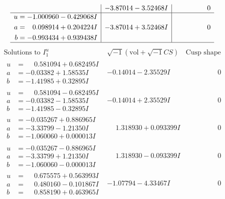 \documentclass[1p]{elsarticle_modified}
\theoremstyle{definition}
\newcommand{\I}{\sqrt{-1}}
\begin{document}
$$\begin{array}{c|c|c}
 & -3.87014 - 3.52468 I & \phantom{-0.000000 } 0 \\ \hline\begin{aligned}
u &= -1.000960 - 0.429068 I \\
a &= \phantom{-}0.098914 + 0.204224 I \\
b &= -0.993434 + 0.939438 I\end{aligned}
 & -3.87014 + 3.52468 I & \phantom{-0.000000 } 0\\
 \hline 
 \end{array}$$\newpage$$\begin{array}{c|c|c}  
\text{Solutions to }I^u_{1}& \I (\text{vol} + \sqrt{-1}CS) & \text{Cusp shape}\\
 \hline 
\begin{aligned}
u &= \phantom{-}0.581094 + 0.682495 I \\
a &= -0.03382 + 1.58535 I \\
b &= -1.41985 + 0.32895 I\end{aligned}
 & -0.14014 - 2.35529 I & \phantom{-0.000000 } 0 \\ \hline\begin{aligned}
u &= \phantom{-}0.581094 - 0.682495 I \\
a &= -0.03382 - 1.58535 I \\
b &= -1.41985 - 0.32895 I\end{aligned}
 & -0.14014 + 2.35529 I & \phantom{-0.000000 } 0 \\ \hline\begin{aligned}
u &= -0.035267 + 0.886965 I \\
a &= -3.33799 - 1.21350 I \\
b &= -1.060060 + 0.000013 I\end{aligned}
 & \phantom{-}1.318930 + 0.093399 I & \phantom{-0.000000 } 0 \\ \hline\begin{aligned}
u &= -0.035267 - 0.886965 I \\
a &= -3.33799 + 1.21350 I \\
b &= -1.060060 - 0.000013 I\end{aligned}
 & \phantom{-}1.318930 - 0.093399 I & \phantom{-0.000000 } 0 \\ \hline\begin{aligned}
u &= \phantom{-}0.675575 + 0.563993 I \\
a &= \phantom{-}0.480160 - 0.101867 I \\
b &= \phantom{-}0.858190 + 0.463965 I\end{aligned}
 & -1.07794 - 4.33467 I & \phantom{-0.000000 } 0 \\ \hline\begin{aligned}

\end{aligned}
\end{array}$$
\end{document}
